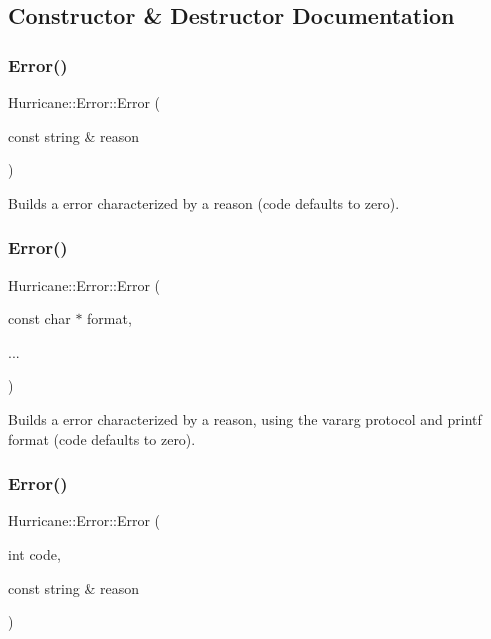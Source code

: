 \subsection{Constructor \& Destructor Documentation}
\mbox{\label{classHurricane_1_1Error_ab58387c890740ed8082532c5342f2d03}} 
\subsubsection{\texorpdfstring{Error()}{Error()}\hspace{0.1cm}{\footnotesize\ttfamily [1/5]}}
{\footnotesize\ttfamily Hurricane\+::\+Error\+::\+Error (\begin{DoxyParamCaption}\item[{const string \&}]{reason }\end{DoxyParamCaption})}

Builds a error characterized by a reason (code defaults to zero). \mbox{\label{classHurricane_1_1Error_a98f50dcce8258982d450e8f5f79cff38}} 
\subsubsection{\texorpdfstring{Error()}{Error()}\hspace{0.1cm}{\footnotesize\ttfamily [2/5]}}
{\footnotesize\ttfamily Hurricane\+::\+Error\+::\+Error (\begin{DoxyParamCaption}\item[{const char $\ast$}]{format,  }\item[{}]{... }\end{DoxyParamCaption})}

Builds a error characterized by a reason, using the {\ttfamily vararg} protocol and {\ttfamily printf} format (code defaults to zero). \mbox{\label{classHurricane_1_1Error_a33e4d2a1ea71be6395dc2716b68378c8}} 
\subsubsection{\texorpdfstring{Error()}{Error()}\hspace{0.1cm}{\footnotesize\ttfamily [3/5]}}
{\footnotesize\ttfamily Hurricane\+::\+Error\+::\+Error (\begin{DoxyParamCaption}\item[{int}]{code,  }\item[{const string \&}]{reason }\end{DoxyParamCaption})}

